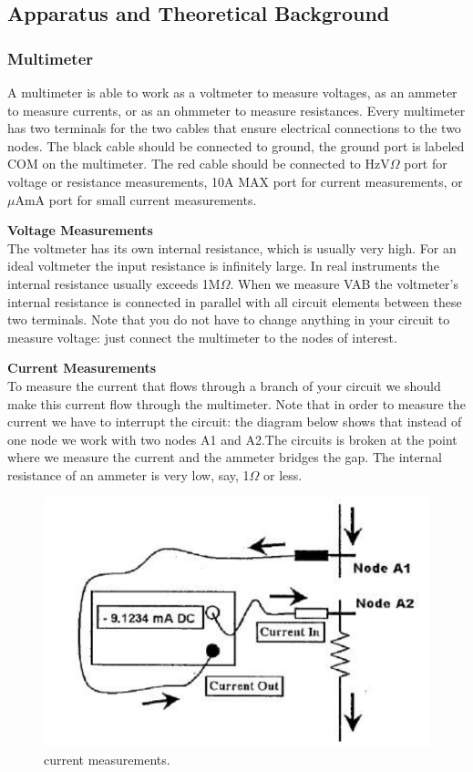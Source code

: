 \documentclass{article}
\begin{document}
	\subsection{Apparatus and Theoretical Background}
\subsubsection{Multimeter}
A multimeter is able to work as a voltmeter to measure voltages, as an ammeter to measure currents, or as an ohmmeter to measure resistances.  Every multimeter has two terminals for the two cables that ensure electrical connections to the two nodes. The black cable should be connected to ground, the ground port is labeled COM on the multimeter. The red cable should be connected to HzV$\Omega$ port for voltage or resistance measurements, 10A MAX port for current measurements, or $\mu$AmA port for small current measurements.

\vspace{10pt}
\indent \textbf{Voltage Measurements} \\
\indent The voltmeter has its own internal resistance, which is usually very high. For an ideal voltmeter the input resistance is infinitely large. In real instruments the internal resistance usually exceeds 1M$\Omega$. When we measure VAB the voltmeter’s internal resistance is connected in parallel with all circuit elements between these two terminals. Note that you do not have to change anything in your circuit to measure voltage: just connect the multimeter to the nodes of interest.

\vspace{10pt}
\indent \textbf{Current Measurements} \\
\indent To measure the current that flows through a branch of your circuit we should make this current flow through the multimeter. Note that in order to measure the current we have to interrupt the circuit: the diagram below shows that instead of one node we work with two nodes A1 and A2.The circuits is broken at the point where we measure the current and the ammeter bridges the gap. The internal resistance of an ammeter is very low, say, 1$\Omega$ or less.
\begin{figure}[H]\centering
\includegraphics[scale=0.3]{current_measurements.png}
\caption{current measurements.}\label{figCurr}
\end{figure}
\end{document}
